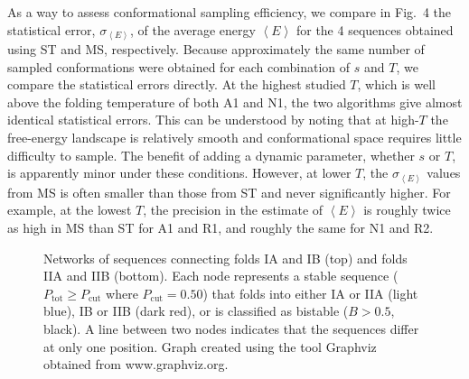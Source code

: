 \documentclass[
aip,
rsi,%
amsmath,amssymb,
reprint,%
]{revtex4-1}
\newcommand	 {\sbar}	{{s}}
\newcommand	 {\kb}		{{k_\mathrm{B}}}
\newcommand {\Pcut}     	{{P_\mathrm{cut}}}
\newcommand {\Ptot}	{{P_\mathrm{tot}}}
\newcommand {\sigE}	{{\sigma_{\left < E \right >}}}
\begin{document}
As a way to assess conformational sampling efficiency, we compare in Fig.~4 the statistical error, $\sigE$, of the average energy $\left <E\right >$ for the 4 sequences obtained using ST and MS, respectively. Because approximately the same number of sampled conformations were obtained for each combination of $\sbar$ and $T$, we compare the statistical errors directly. At the highest studied $T$, which is well above the folding temperature of both A1 and N1, the two algorithms give almost identical statistical errors. This can be understood by noting that at high-$T$ the free-energy landscape is relatively smooth and conformational space requires little difficulty to sample. The benefit of adding a dynamic parameter, whether $\sbar$ or $T$, is apparently minor under these conditions. However, at lower $T$, the $\sigE$ values from MS is often smaller than those from ST and never significantly higher. For example, at the lowest $T$, the precision in the estimate of $\left < E\right >$ is roughly twice as high in MS than ST for A1 and R1, and roughly the same for N1 and R2. 



\begin{figure}
\caption{Networks of sequences connecting folds IA and IB (top) and folds IIA and IIB (bottom). Each node represents a stable sequence ($\Ptot\ge\Pcut$ where $\Pcut=0.50$) that folds into either IA or IIA (light blue), IB or IIB (dark red), or is classified as bistable ($B>0.5$, black). A line between two nodes indicates that the sequences differ at only one position. Graph created using the tool Graphviz~\protect\cite{Graphviz2000} obtained from  www.graphviz.org.}
\end{figure}

\vspace{12pt}
\end{document}
